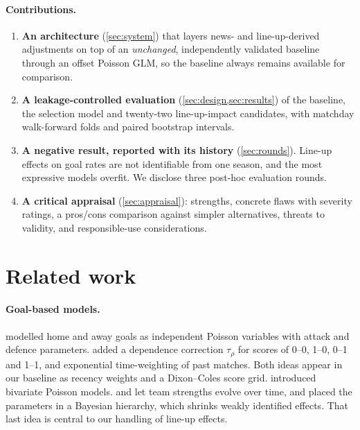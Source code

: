 \documentclass[11pt,a4paper]{article}
\begin{document}
\paragraph{Contributions.}
\begin{enumerate}
  \item \textbf{An architecture} (\cref{sec:system}) that layers news- and
        line-up-derived adjustments on top of an \emph{unchanged}, independently
        validated baseline through an offset Poisson GLM, so the baseline always
        remains available for comparison.
  \item \textbf{A leakage-controlled evaluation} (\cref{sec:design,sec:results})
        of the baseline, the selection model and twenty-two line-up-impact
        candidates, with matchday walk-forward folds and paired bootstrap
        intervals.
  \item \textbf{A negative result, reported with its history}
        (\cref{sec:rounds}). Line-up effects on goal rates are not identifiable
        from one season, and the most expressive models overfit. We disclose
        three post-hoc evaluation rounds.
  \item \textbf{A critical appraisal} (\cref{sec:appraisal}): strengths,
        concrete flaws with severity ratings, a pros/cons comparison against
        simpler alternatives, threats to validity, and responsible-use
        considerations.
\end{enumerate}

\section{Related work}\label{sec:related}

\paragraph{Goal-based models.}
\citet{maher1982} modelled home and away goals as independent Poisson variables
with attack and defence parameters. \citet{dixon1997} added a dependence
correction $\tau_\rho$ for scores of 0--0, 1--0, 0--1 and 1--1, and
exponential time-weighting of past matches. Both ideas appear in our baseline
as recency weights and a Dixon--Coles score grid. \citet{karlis2003} introduced
bivariate Poisson models. \citet{rue2000} and \citet{koopman2015} let team
strengths evolve over time, and \citet{baio2010} placed the parameters in a
Bayesian hierarchy, which shrinks weakly identified effects. That last idea is
central to our handling of line-up effects.
\end{document}
